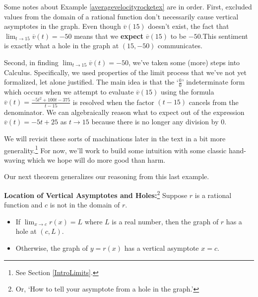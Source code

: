 \documentclass{ximera}
\begin{document}
\begin{example}
\begin{explanation}
\begin{enumerate}
\begin{center}
\end{center}

\end{enumerate}

\end{explanation}

\end{example} 

Some notes about Example \ref{averagevelocityrocketex}  are in order.  First, excluded values from the domain of a rational function don't necessarily cause vertical asymptotes in the graph.  Even though  $\overline{v}(15)$  doesn't exist, the fact that  $\lim_{t \rightarrow 15} \overline{v}(t) = -50$ means that we \textbf{expect} $\overline{v}(15)$ to be $-50$.This sentiment is exactly what a hole in the graph at $(15, -50)$ communicates.

Second, in finding $\lim_{t \rightarrow 15} \overline{v}(t) = -50$, we've taken some (more) steps into Calculus.  Specifically, we used properties of the limit process that we've not yet formalized, let alone justified.  The main idea is that the `$\frac{0}{0}$'  indeterminate form which occurs when we attempt to evaluate $\overline{v}(15)$ using the formula  $\overline{v}(t) =  \frac{-5t^2+100t - 375}{t - 15}$ is resolved when the factor  $(t-15)$ cancels from the denominator.  We can algebraically reason what to expect out of the expression $\overline{v}(t) = -5t+25$ as $t \rightarrow 15$ because there is no longer any division by $0$.

We will revisit these sorts of machinations later in the text in a bit more generality.\footnote{See Section \ref{IntroLimits}.}  For now, we'll work to build some intuition with some classic hand-waving which we hope will do more good than harm.

Our next theorem generalizes our reasoning from this last example.
 
\begin{theorem}  \textbf{Location of Vertical Asymptotes and Holes:}\footnote{Or, `How to tell your asymptote from a hole in the graph.'}  \label{vavshole}  Suppose $r$ is a rational function and $c$ is not in the domain of $r$.  

\begin{itemize}

\item If $\lim_{x \rightarrow c} r(x) = L$  where $L$ is a real number, then the graph of $r$ has a hole at $(c, L)$.

\item  Otherwise, the graph of $y = r(x)$ has a vertical asymptote $x = c$.

\end{itemize}

\end{theorem}
\end{document}

